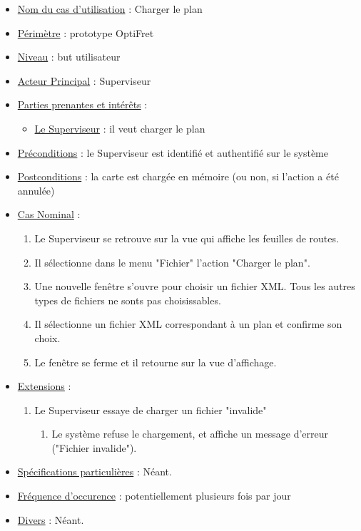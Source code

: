 \documentclass[a4paper, 10pt]{article}
\begin{document}
\begin{itemize}[label = \textbullet, font = \color{orange}]
    \item \underline{Nom du cas d'utilisation} : Charger le plan
    \item \underline{Périmètre} : prototype OptiFret
    \item \underline{Niveau} : but utilisateur
    \item \underline{Acteur Principal} : Superviseur
    \item \underline{Parties prenantes et intérêts} :
    \begin{itemize}[label = \textbullet, font = \color{blue}]
        \item \underline{Le Superviseur} : il veut charger le plan
    \end{itemize}
    \item \underline{Préconditions} : le Superviseur est identifié et
        authentifié sur le système
    \item \underline{Postconditions} : la carte est chargée en mémoire (ou non,
        si l'action a été annulée)
    \item \underline{Cas Nominal} :
    \begin{enumerate}
        \item Le Superviseur se retrouve sur la vue qui affiche les feuilles de
            routes.
        \item Il sélectionne dans le menu "Fichier" l'action "Charger le plan".
        \item Une nouvelle fenêtre s'ouvre pour choisir un fichier XML. Tous
            les autres types de fichiers ne sonts pas choisissables.
        \item Il sélectionne un fichier XML correspondant à un plan et confirme
            son choix.
        \item Le fenêtre se ferme et il retourne sur la vue d'affichage.
    \end{enumerate}
    \item \underline{Extensions} :
    \begin{enumerate}
        \item Le Superviseur essaye de charger un fichier "invalide"
            \begin{enumerate}
                \item Le système refuse le chargement, et affiche un
                    message d'erreur ("Fichier invalide").
            \end{enumerate}
    \end{enumerate}
    \item \underline{Spécifications particulières} : Néant.
    \item \underline{Fréquence d'occurence} : potentiellement plusieurs fois
        par jour
    \item \underline{Divers} : Néant.
\end{itemize}
\end{document}
